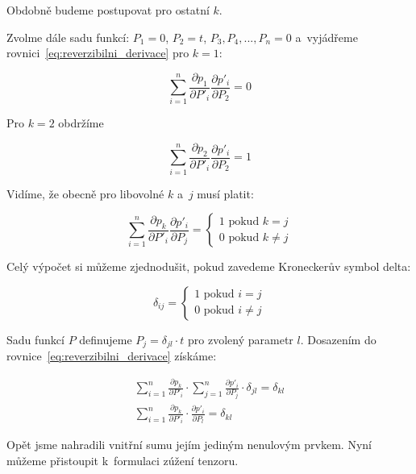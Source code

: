 \documentclass{book}
\begin{document}
Obdobně budeme postupovat pro ostatní \(k\).

Zvolme dále sadu funkcí: \(P_1 = 0\), \(P_2 = t\), \(P_3, P_4, ..., P_n = 0\) a~vyjádřeme rovnici~\eqref{eq:reverzibilni_derivace} pro \(k = 1\):

\begin{equation}
\sum_{i=1}^n \frac{\partial p_1}{\partial P'_i} \frac{\partial p'_i}{\partial P_2} = 0
\end{equation}

Pro \(k = 2\) obdržíme

\begin{equation}
\sum_{i=1}^n \frac{\partial p_2}{\partial P'_i} \frac{\partial p'_i}{\partial P_2} = 1
\end{equation}

Vidíme, že obecně pro libovolné \(k\) a~\(j\) musí platit:

\begin{equation}
\sum_{i=1}^n \frac{\partial p_k}{\partial P'_i} \frac{\partial p'_i}{\partial P_j} =
\begin{cases}
	1 \text{ pokud } k = j \\
	0 \text{ pokud } k \neq j
\end{cases}
\end{equation}

Celý výpočet si můžeme zjednodušit, pokud zavedeme Kroneckerův symbol delta:

\begin{equation}
\delta_{ij} =
\begin{cases}
	1 \text{ pokud } i = j \\
	0 \text{ pokud } i \neq j
\end{cases}
\end{equation}

Sadu funkcí \(P\) definujeme \(P_j = \delta_{jl} \cdot t\) pro zvolený parametr \(l\). Dosazením do rovnice~\eqref{eq:reverzibilni_derivace} získáme:

\begin{equation}
\begin{split}
\sum_{i=1}^n \frac{\partial p_k}{\partial P'_i} \cdot \sum_{j=1}^n \frac{\partial p'_i}{\partial P_j} \cdot \delta_{jl} = \delta_{kl} \\
\sum_{i=1}^n \frac{\partial p_k}{\partial P'_i} \cdot \frac{\partial p'_i}{\partial P_l} = \delta_{kl}
\end{split}
\end{equation}

Opět jsme nahradili vnitřní sumu jejím jediným nenulovým prvkem. Nyní můžeme přistoupit k~formulaci zúžení tenzoru. 
\end{document}
